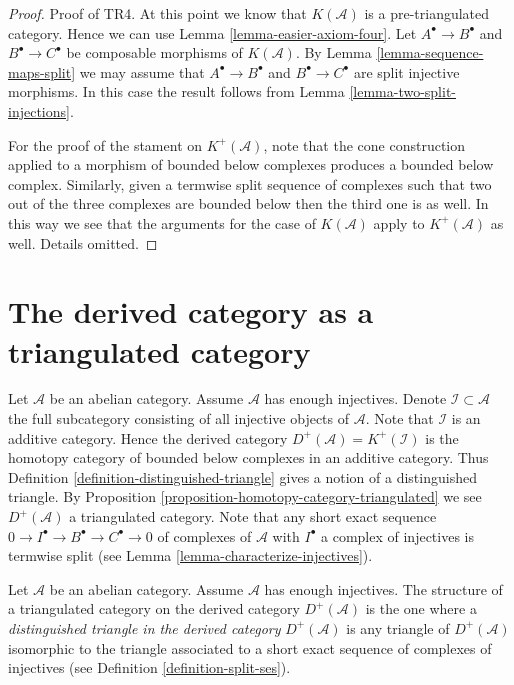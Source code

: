 \begin{proof}
\medskip\noindent
Proof of TR4. At this point we know that $K(\mathcal{A})$
is a pre-triangulated category. Hence we can use
Lemma \ref{lemma-easier-axiom-four}. Let $A^\bullet \to B^\bullet$
and $B^\bullet \to C^\bullet$ be composable morphisms of
$K(\mathcal{A})$. By Lemma \ref{lemma-sequence-maps-split} we may assume that
$A^\bullet \to B^\bullet$ and $B^\bullet \to C^\bullet$
are split injective morphisms. In this case the result follows
from Lemma \ref{lemma-two-split-injections}.

\medskip\noindent
For the proof of the stament on $K^{+}(\mathcal{A})$, note that
the cone construction applied to a morphism of bounded below
complexes produces a bounded below complex. Similarly, given a termwise
split sequence of complexes such that two out of the three complexes
are bounded below then the third one is as well. In this way
we see that the arguments for the case of $K(\mathcal{A})$ apply
to $K^{+}(\mathcal{A})$ as well. Details omitted.
\end{proof}









\section{The derived category as a triangulated category}
\label{section-derived-triangulated}

\noindent
Let $\mathcal{A}$ be an abelian category.
Assume $\mathcal{A}$ has enough injectives.
Denote $\mathcal{I} \subset \mathcal{A}$ the full subcategory consisting
of all injective objects of $\mathcal{A}$. Note that $\mathcal{I}$
is an additive category. Hence the derived category
$D^{+}(\mathcal{A}) = K^{+}(\mathcal{I})$ is the
homotopy category of bounded below complexes in an additive category.
Thus Definition \ref{definition-distinguished-triangle}
gives a notion of a distinguished triangle. By
Proposition \ref{proposition-homotopy-category-triangulated}
we see $D^{+}(\mathcal{A})$ a triangulated category.
Note that any short exact sequence
$0 \to I^\bullet \to B^\bullet \to C^\bullet \to 0$
of complexes of $\mathcal{A}$ with $I^\bullet$ a complex of injectives
is termwise split (see Lemma \ref{lemma-characterize-injectives}).

\begin{definition}
\label{definition-derived-triangulated}
Let $\mathcal{A}$ be an abelian category.
Assume $\mathcal{A}$ has enough injectives.
The structure of a triangulated category on
the derived category $D^{+}(\mathcal{A})$ is the one where
a {\it distinguished triangle in the derived category}
$D^{+}(\mathcal{A})$ is any triangle of $D^{+}(\mathcal{A})$
isomorphic to the triangle associated to a short exact sequence
of complexes of injectives (see Definition \ref{definition-split-ses}).
\end{definition}

